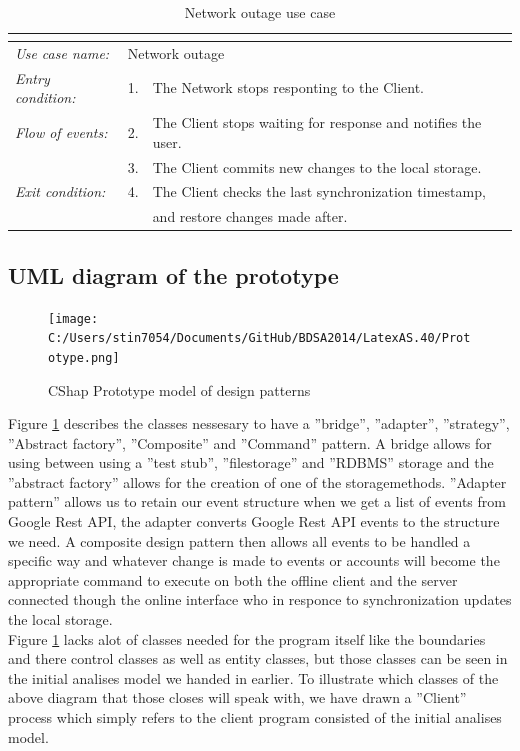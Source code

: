 \documentclass[a4paper]{article}
\begin{document}
\begin{table}
\centering
\begin{tabular}{l r l}
	\multicolumn{2}{c}{} \\
	\hline
	\textit{Use case name:}		&\multicolumn{2}{l}{Network outage} \\
    \hline
	\textit{Entry condition:}		&1.&The Network stops responting to the Client.\\
	\hline
	\textit{Flow of events:}		&2.&The Client stops waiting for response and notifies the user.\\
						&3.&The Client commits new changes to the local storage.\\
	\hline
	\textit{Exit condition:}		&4.&The Client checks the last synchronization timestamp,\\
							&& and restore changes made after.\\
	\hline
\end{tabular}
\caption{Network outage use case}
\label{tab:Network}
\end{table}

\subsection{UML diagram of the prototype}

\begin{figure}
\centering
\texttt{[image: C:/Users/stin7054/Documents/GitHub/BDSA2014/LatexAS.40/Prototype.png]}
\caption{CShap Prototype model of design patterns}
\label{fig:Prototype}
\end{figure}

Figure \ref{fig:Prototype} describes the classes nessesary to have a ''bridge'', ''adapter'', ''strategy'', ''Abstract factory'', ''Composite'' and ''Command'' pattern. A bridge allows for using between using a ''test stub'', ''filestorage'' and ''RDBMS'' storage and the ''abstract factory'' allows for the creation of one of the storagemethods. ''Adapter pattern'' allows us to retain our event structure when we get a list of events from Google Rest API, the adapter converts Google Rest API events to the structure we need. A composite design pattern then allows all events to be handled a specific way and whatever change is made to events or accounts will become the appropriate command to execute on both the offline client and the server connected though the online interface who in responce to synchronization updates the local storage.\\
Figure \ref{fig:Prototype} lacks alot of classes needed for the program itself like the boundaries and there control classes as well as entity classes, but those classes can be seen in the initial analises model we handed in earlier. To illustrate which classes of the above diagram that those closes will speak with, we have drawn a ''Client'' process which simply refers to the client program consisted of the initial analises model.
\end{document}
